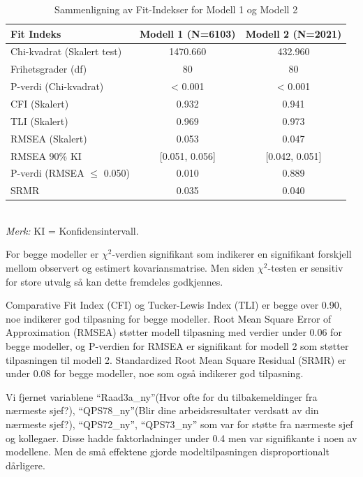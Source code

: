 \documentclass[
  12pt,
  a4paper,
  DIV=11,
  numbers=noendperiod]{scrartcl}
\begin{document}
\begin{table}[htbp]
\centering
\caption{Sammenligning av Fit-Indekser for Modell 1 og Modell 2}
\label{tab:fit_comparison_model1_model2}
\begin{tabular}{@{}lcc@{}}
\toprule
Fit Indeks                      & Modell 1 (N=6103) & Modell 2 (N=2021) \\
\midrule
Chi-kvadrat (Skalert test)      & 1470.660          & 432.960           \\
Frihetsgrader (df)              & 80                & 80                \\
P-verdi (Chi-kvadrat)           & < 0.001           & < 0.001           \\
CFI (Skalert)                   & 0.932             & 0.941             \\
TLI (Skalert)                   & 0.969             & 0.973             \\
RMSEA (Skalert)                 & 0.053             & 0.047             \\
RMSEA 90\% KI                   & [0.051, 0.056]    & [0.042, 0.051]    \\
P-verdi (RMSEA $\le$ 0.050)     & 0.010             & 0.889             \\
SRMR                            & 0.035             & 0.040             \\
\bottomrule
\end{tabular}
\raggedright
\footnotesize{\\
\textit{Merk:} KI = Konfidensintervall.
}
\end{table}

For begge modeller er \(\chi^2\)-verdien signifikant som indikerer en
signifikant forskjell mellom observert og estimert kovariansmatrise. Men
siden \(\chi^2\)-testen er sensitiv for store utvalg så kan dette
fremdeles godkjennes.

Comparative Fit Index (CFI) og Tucker-Lewis Index (TLI) er begge over
0.90, noe indikerer god tilpasning for begge modeller. Root Mean Square
Error of Approximation (RMSEA) støtter modell tilpasning med verdier
under 0.06 for begge modeller, og P-verdien for RMSEA er signifikant for
modell 2 som støtter tilpasningen til modell 2. Standardized Root Mean
Square Residual (SRMR) er under 0.08 for begge modeller, noe som også
indikerer god tilpasning.

Vi fjernet variablene ``Raad3a\_ny''(Hvor ofte for du tilbakemeldinger
fra nærmeste sjef?), ``QPS78\_ny''(Blir dine arbeidsresultater verdsatt
av din nærmeste sjef?), ``QPS72\_ny'', ``QPS73\_ny'' som var for støtte
fra nærmeste sjef og kollegaer. Disse hadde faktorladninger under 0.4
men var signifikante i noen av modellene. Men de små effektene gjorde
modeltilpasningen disproportionalt dårligere.
\end{document}

